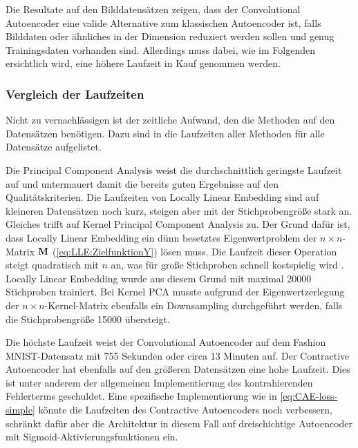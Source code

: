 Die Resultate auf den Bilddatensätzen zeigen, dass der Convolutional Autoencoder eine valide
Alternative zum klassischen Autoencoder ist, falls Bilddaten oder ähnliches in der Dimension
reduziert werden sollen und genug Trainingsdaten vorhanden sind. Allerdings muss dabei, wie im
Folgenden ersichtlich wird, eine höhere Laufzeit in Kauf genommen werden.

\subsubsection{Vergleich der Laufzeiten}

Nicht zu vernachlässigen ist der zeitliche Aufwand, den die Methoden auf den Datensätzen benötigen.
Dazu sind in  die Laufzeiten aller Methoden für alle Datensätze
aufgelistet.


Die Principal Component Analysis weist die durchschnittlich geringste Laufzeit auf und untermauert damit die bereits guten Ergebnisse auf den Qualitätskriterien. Die Laufzeiten von Locally Linear Embedding sind auf kleineren Datensätzen noch kurz, steigen aber mit der Stichprobengröße stark an. Gleiches trifft auf Kernel Principal Component Analysis zu. Der Grund dafür ist, dass Locally Linear Embedding ein dünn besetztes Eigenwertproblem der $n \times n$-Matrix $\mathbf{M}$ (\eqref{eq:LLE:ZielfunktionY}) lösen muss. Die Laufzeit dieser Operation steigt quadratisch mit $n$ an, was für große Stichproben schnell kostspielig wird \parencite[9]{Saul.2000}. Locally Linear Embedding wurde aus diesem Grund mit maximal \num{20000}
Stichproben trainiert. Bei Kernel PCA musste aufgrund der Eigenwertzerlegung der $n \times
	n$-Kernel-Matrix ebenfalls ein Downsampling durchgeführt werden, falls die Stichprobengröße
\num{15000} übersteigt.

Die höchste Laufzeit weist der Convolutional Autoencoder auf dem Fashion MNIST-Datensatz mit 755
Sekunden oder circa 13 Minuten auf. Der Contractive Autoencoder hat ebenfalls auf den größeren
Datensätzen eine hohe Laufzeit. Dies ist unter anderem der allgemeinen Implementierung des
kontrahierenden Fehlerterms geschuldet. Eine spezifische Implementierung wie in
\eqref{eq:CAE-loss-simple} könnte die Laufzeiten des Contractive Autoencoders noch verbessern,
schränkt dafür aber die Architektur in diesem Fall auf dreischichtige Autoencoder mit
Sigmoid-Aktivierungsfunktionen ein.

